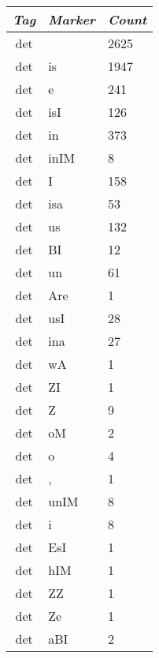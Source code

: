 \documentclass[a4 paper]{article}
\begin{document}
\begin{longtable}{cp{}p{}}
    \toprule
    \textit{Tag} & \textit{Marker} & \textit{Count} \\ 
    \toprule
det &  & 2625\\ \midrule det & is & 1947\\ \midrule det & e & 241\\ \midrule det & isI & 126\\ \midrule det & in & 373\\ \midrule det & inIM & 8\\ \midrule det & I & 158\\ \midrule det & isa & 53\\ \midrule det & us & 132\\ \midrule det & BI & 12\\ \midrule det & un & 61\\ \midrule det & Are & 1\\ \midrule det & usI & 28\\ \midrule det & ina & 27\\ \midrule det & wA & 1\\ \midrule det & ZI & 1\\ \midrule det & Z & 9\\ \midrule det & oM & 2\\ \midrule det & o & 4\\ \midrule det & , & 1\\ \midrule det & unIM & 8\\ \midrule det & i & 8\\ \midrule det & EsI & 1\\ \midrule det & hIM & 1\\ \midrule det & ZZ & 1\\ \midrule det & Ze & 1\\ \midrule det & aBI & 2\\ \midrule 

\end{longtable}
\end{document}
